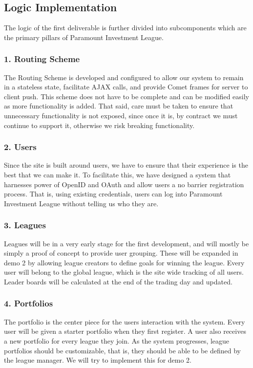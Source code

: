 \subsection{Logic Implementation}
The logic of the first deliverable is further divided into subcomponents which
are the primary pillars of Paramount Investment League. \\
\subsubsection{1. Routing Scheme}
The Routing Scheme is developed and configured to allow our system to remain
in a stateless state, facilitate AJAX calls, and provide Comet frames for server
to client push.  This scheme does not have to be complete and can be modified
easily as more functionality is added. That said, care must be taken to ensure
that unnecessary functionality is not exposed, since once it is, by contract we
must continue to support it, otherwise we risk breaking functionality.\\
\subsubsection{2. Users}
Since the site is built around users, we have to ensure that their experience is
the best that we can make it.  To facilitate this, we have designed a system
that harnesses power of OpenID\cite{wiki:open} and OAuth\cite{wiki:oauth} and
allow users a no barrier registration process.  That is, using existing
credentials, users can log into Paramount Investment League without telling us
who they are.\\
\subsubsection{3. Leagues}
Leagues will be in a very early stage for the first development, and will mostly
be simply a proof of concept to provide user grouping.  These will be expanded
in demo 2 by allowing league creators to define goals for winning the league.
Every user will belong to the global league, which is the site wide tracking
of all users.  Leader boards will be calculated at the end of the trading day
and updated.\\
\subsubsection{4. Portfolios}
The portfolio is the center piece for the users interaction with the system.
Every user will be given a starter portfolio when they first register.  A user
also receives a new portfolio for every league they join.  As the system
progresses, league portfolios should be customizable, that is, they should be
able to be defined by the league manager.  We will try to implement this for
demo 2.\\
